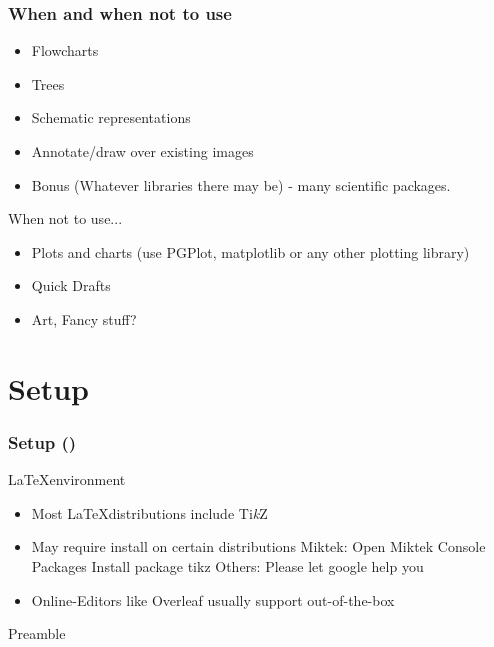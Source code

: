 \documentclass{beamer}
\newcommand{\tikzname}{Ti\textit{k}Z\xspace}
\begin{document}
\begin{frame}
    \begin{figure}
        
    \end{figure}
\end{frame}


\begin{frame}
    \frametitle{When and when not to use}

    \begin{itemize}
        \item Flowcharts
        \item Trees
        \item Schematic representations
        \item Annotate/draw over existing images
        \item Bonus (Whatever libraries there may be) - many scientific packages.
     \end{itemize}

     \begin{block}{When not to use...}
     \begin{itemize}
         \item Plots and charts (use PGPlot, matplotlib or any other plotting library)
         \item Quick Drafts
         \item Art, Fancy stuff?
     \end{itemize}
    \end{block}
\end{frame}


\section{Setup}

\begin{frame}[fragile]
\frametitle{Setup ()}
\begin{block}{\LaTeX environment}
    \begin{itemize}
        \item Most \LaTeX distributions include \tikzname
        \item May require install on certain distributions
        \subitem Miktek: Open Miktek Console \rightarrow Packages \rightarrow Install package tikz
        \subitem Others: Please let google help you
        \item Online-Editors like Overleaf usually support out-of-the-box
    \end{itemize}
\end{block}

\begin{block}{Preamble}
    \verbatim{\usepackage{tikz}}
    \verbatim{\usetikzlibrary{tikz.positioning}}
\end{block}

\end{frame}
\end{document}

